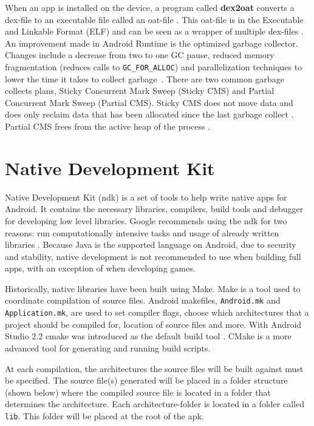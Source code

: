 When an app is installed on the device, a program called \textbf{dex2oat} converts a \gls{dex}-file to an executable file called an oat-file \cite{android:art:dalvik}. This oat-file is in the Executable and Linkable Format (ELF) and can be seen as a wrapper of multiple \gls{dex}-files \cite{Dresel2016}. An improvement made in Android Runtime is the optimized garbage collector. Changes include a decrease from two to one GC pause, reduced memory fragmentation (reduces calls to \texttt{GC\_FOR\_ALLOC}) and parallelization techniques to lower the time it takes to collect garbage~\cite{android:art:dalvik}. There are two common garbage collects plans, Sticky Concurrent Mark Sweep (Sticky CMS) and Partial Concurrent Mark Sweep (Partial CMS). Sticky CMS does not move data and does only reclaim data that has been allocated since the last garbage collect \cite{android:art:gc}. Partial CMS frees from the active heap of the process \cite[p.~122]{sillars2015high}.

\section{Native Development Kit}
Native Development Kit (\gls{ndk}) is a set of tools to help write native apps for Android. It contains the necessary libraries, compilers, build tools and debugger for developing low level libraries. Google recommends using the \gls{ndk} for two reasons: run computationally intensive tasks and usage of already written libraries \cite{android:ndk:guides}. Because Java is the supported language on Android, due to security and stability, native development is not recommended to use when building full apps, with an exception of when developing games.

Historically, native libraries have been built using Make. Make is a tool used to coordinate compilation of source files. Android makefiles, \texttt{Android.mk} and \texttt{Application.mk}, are used to set compiler flags, choose which architectures that a project should be compiled for, location of source files and more. With Android Studio 2.2 \gls{cmake} was introduced as the default build tool \cite{android:studio:cmake}. CMake is a more advanced tool for generating and running build scripts.

At each compilation, the architectures the source files will be built against must be specified. The source file(s) generated will be placed in a folder structure (shown below) where the compiled source file is located in a folder that determines the architecture. Each architecture-folder is located in a folder called \texttt{lib}. This folder will be placed at the root of the \gls{apk}.

